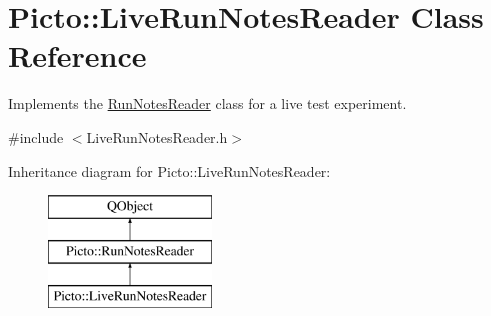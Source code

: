\hypertarget{class_picto_1_1_live_run_notes_reader}{\section{Picto\-:\-:Live\-Run\-Notes\-Reader Class Reference}
\label{class_picto_1_1_live_run_notes_reader}
}


Implements the \hyperlink{class_picto_1_1_run_notes_reader}{Run\-Notes\-Reader} class for a live test experiment.  




{\ttfamily \#include $<$Live\-Run\-Notes\-Reader.\-h$>$}

Inheritance diagram for Picto\-:\-:Live\-Run\-Notes\-Reader\-:\begin{figure}[H]
\begin{center}
\leavevmode
\includegraphics[height=3.000000cm]{class_picto_1_1_live_run_notes_reader}
\end{center}
\end{figure}
